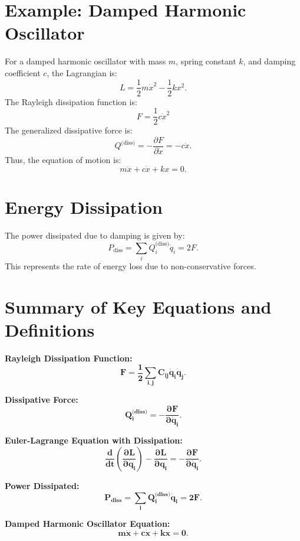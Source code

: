 \documentclass[a4paper,12pt]{article}
\begin{document}
\section{Example: Damped Harmonic Oscillator}
For a damped harmonic oscillator with mass \( m \), spring constant \( k \), and damping coefficient \( c \), the Lagrangian is:
\begin{equation*}
    L = \frac{1}{2} m \dot{x}^2 - \frac{1}{2} k x^2.
\end{equation*}
The Rayleigh dissipation function is:
\begin{equation*}
    F = \frac{1}{2} c \dot{x}^2
\end{equation*}
The generalized dissipative force is:
\begin{equation*}
    Q^{\text{(diss)}} = - \frac{\partial F}{\partial \dot{x}} = - c \dot{x}.
\end{equation*}
Thus, the equation of motion is:
\begin{equation*}
    m \ddot{x} + c \dot{x} + kx = 0.
\end{equation*}

\section{Energy Dissipation}
The power dissipated due to damping is given by:
\begin{equation*}
    P_{\text{diss}} = \sum_{i} Q_i^{\text{(diss)}} \dot{q}_i = 2F.
\end{equation*}
This represents the rate of energy loss due to non-conservative forces.

\section{Summary of Key Equations and Definitions}

     \textbf{Rayleigh Dissipation Function:}
    \begin{equation*}
        \mathbf{F = \frac{1}{2} \sum_{i,j} C_{ij} \dot{q}_i \dot{q}_j.}
    \end{equation*}
    
     \textbf{Dissipative Force:}
    \begin{equation*}
        \mathbf{Q_i^{\text{(diss)}} = - \frac{\partial F}{\partial \dot{q}_i}.}
    \end{equation*}
    
     \textbf{Euler-Lagrange Equation with Dissipation:}
    \begin{equation*}
        \mathbf{\frac{d}{dt} \left( \frac{\partial L}{\partial \dot{q}_i} \right) - \frac{\partial L}{\partial q_i} = -\frac{\partial F}{\partial \dot{q}_i}.}
    \end{equation*}
    
     \textbf{Power Dissipated:}
    \begin{equation*}
        \mathbf{P_{\text{diss}} = \sum_{i} Q_i^{\text{(diss)}} \dot{q}_i = 2F.}
    \end{equation*}
    
     \textbf{Damped Harmonic Oscillator Equation:}
    \begin{equation*}
        \mathbf{m \ddot{x} + c \dot{x} + kx = 0.}
    \end{equation*}
\end{document}

